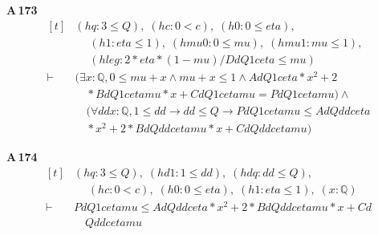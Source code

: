\noindent\textbf{A\,173}\quad{}
{\footnotesize\[ \begin{aligned}[t]
&(\mathit{hq} : 3 \leq \mathit{Q}),\; (\mathit{hc} : 0 < \mathit{c}),\; (\mathit{h0} : 0 \leq \mathit{eta}),\\
&\quad \; (\mathit{h1} : \mathit{eta} \leq 1),\; (\mathit{hmu0} : 0 \leq \mathit{mu}),\; (\mathit{hmu1} : \mathit{mu} \leq 1),\\
&\quad \; (\mathit{hleg} : 2 * \mathit{eta} * (1 - \mathit{mu}) / \mathit{Dd} \mathit{Q} 1 \mathit{c} \mathit{eta} \leq \mathit{mu})\\
\vdash\;&(\exists \mathit{x} : \mathbb{Q} , 0 \leq \mathit{mu} + \mathit{x} \wedge \mathit{mu} + \mathit{x} \leq 1 \wedge \mathit{Ad} \mathit{Q} 1 \mathit{c} \mathit{eta} * \mathit{x} ^{2} + 2\\
&\quad * \mathit{Bd} \mathit{Q} 1 \mathit{c} \mathit{eta} \mathit{mu} * \mathit{x} + \mathit{Cd} \mathit{Q} 1 \mathit{c} \mathit{eta} \mathit{mu} = \mathit{Pd} \mathit{Q} 1 \mathit{c} \mathit{eta} \mathit{mu}) \wedge\\
&\quad (\forall \mathit{dd} \mathit{x} : \mathbb{Q} , 1 \leq \mathit{dd} \to \mathit{dd} \leq \mathit{Q} \to \mathit{Pd} \mathit{Q} 1 \mathit{c} \mathit{eta} \mathit{mu} \leq \mathit{Ad} \mathit{Q} \mathit{dd} \mathit{c} \mathit{eta}\\
&\quad * \mathit{x} ^{2} + 2 * \mathit{Bd} \mathit{Q} \mathit{dd} \mathit{c} \mathit{eta} \mathit{mu} * \mathit{x} + \mathit{Cd} \mathit{Q} \mathit{dd} \mathit{c} \mathit{eta} \mathit{mu})
\end{aligned} \]}

\noindent\textbf{A\,174}\quad{}
{\footnotesize\[ \begin{aligned}[t]
&(\mathit{hq} : 3 \leq \mathit{Q}),\; (\mathit{hd1} : 1 \leq \mathit{dd}),\; (\mathit{hdq} : \mathit{dd} \leq \mathit{Q}),\\
&\quad \; (\mathit{hc} : 0 < \mathit{c}),\; (\mathit{h0} : 0 \leq \mathit{eta}),\; (\mathit{h1} : \mathit{eta} \leq 1),\; (\mathit{x} : \mathbb{Q} )\\
\vdash\;&\mathit{Pd} \mathit{Q} 1 \mathit{c} \mathit{eta} \mathit{mu} \leq \mathit{Ad} \mathit{Q} \mathit{dd} \mathit{c} \mathit{eta} * \mathit{x} ^{2} + 2 * \mathit{Bd} \mathit{Q} \mathit{dd} \mathit{c} \mathit{eta} \mathit{mu} * \mathit{x} + \mathit{Cd}\\
&\quad \mathit{Q} \mathit{dd} \mathit{c} \mathit{eta} \mathit{mu}
\end{aligned} \]}

